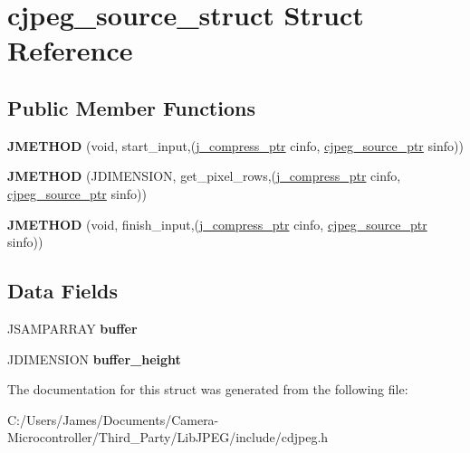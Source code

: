 \hypertarget{structcjpeg__source__struct}{}\section{cjpeg\+\_\+source\+\_\+struct Struct Reference}
\label{structcjpeg__source__struct}
\subsection*{Public Member Functions}
\begin{DoxyCompactItemize}
\item 
\mbox{\label{structcjpeg__source__struct_ae1441d8cc80029af1bb1cd4ce5404703}} 
{\bfseries J\+M\+E\+T\+H\+OD} (void, start\+\_\+input,(\hyperlink{structjpeg__compress__struct}{j\+\_\+compress\+\_\+ptr} cinfo, \hyperlink{structcjpeg__source__struct}{cjpeg\+\_\+source\+\_\+ptr} sinfo))
\item 
\mbox{\label{structcjpeg__source__struct_a853fb288dabc134324412cbffe7f1e35}} 
{\bfseries J\+M\+E\+T\+H\+OD} (J\+D\+I\+M\+E\+N\+S\+I\+ON, get\+\_\+pixel\+\_\+rows,(\hyperlink{structjpeg__compress__struct}{j\+\_\+compress\+\_\+ptr} cinfo, \hyperlink{structcjpeg__source__struct}{cjpeg\+\_\+source\+\_\+ptr} sinfo))
\item 
\mbox{\label{structcjpeg__source__struct_ad980413946c1e03281d6fc915c9fdded}} 
{\bfseries J\+M\+E\+T\+H\+OD} (void, finish\+\_\+input,(\hyperlink{structjpeg__compress__struct}{j\+\_\+compress\+\_\+ptr} cinfo, \hyperlink{structcjpeg__source__struct}{cjpeg\+\_\+source\+\_\+ptr} sinfo))
\end{DoxyCompactItemize}
\subsection*{Data Fields}
\begin{DoxyCompactItemize}
\item 
\mbox{\label{structcjpeg__source__struct_a020c264c21f603ef8cb5822e2ebbba29}} 
J\+S\+A\+M\+P\+A\+R\+R\+AY {\bfseries buffer}
\item 
\mbox{\label{structcjpeg__source__struct_afc922a7a9a60d795a455e3f4dea032a0}} 
J\+D\+I\+M\+E\+N\+S\+I\+ON {\bfseries buffer\+\_\+height}
\end{DoxyCompactItemize}


The documentation for this struct was generated from the following file\+:\begin{DoxyCompactItemize}
\item 
C\+:/\+Users/\+James/\+Documents/\+Camera-\/\+Microcontroller/\+Third\+\_\+\+Party/\+Lib\+J\+P\+E\+G/include/cdjpeg.\+h\end{DoxyCompactItemize}
